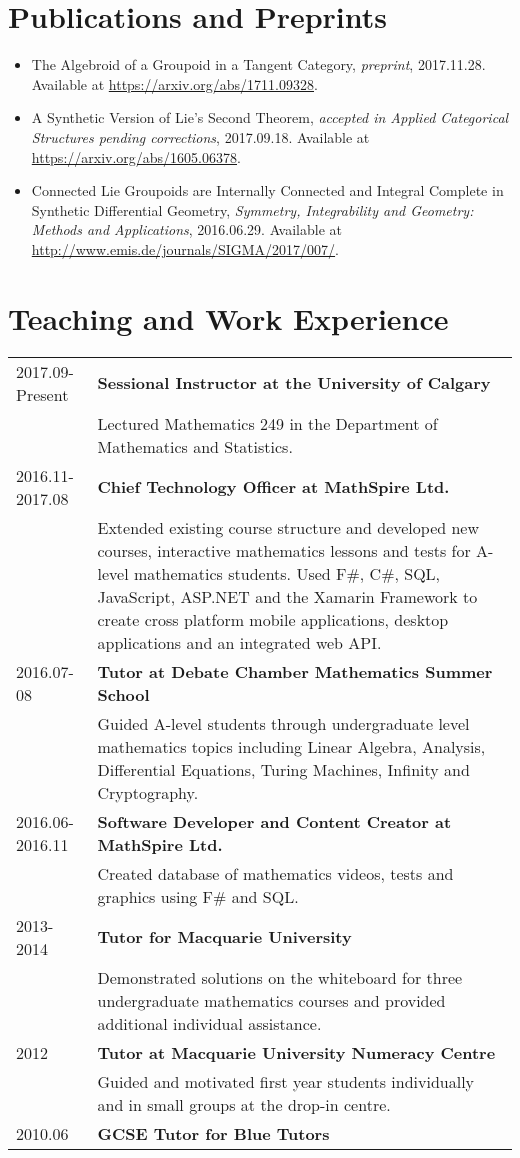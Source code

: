 \documentclass[10pt]{article}
\begin{document}
\section*{Publications and Preprints}
\begin{itemize}
    \item The Algebroid of a Groupoid in a Tangent Category, \emph{preprint}, 2017.11.28. Available at \url{https://arxiv.org/abs/1711.09328}.
    \item A Synthetic Version of Lie's Second Theorem, \emph{accepted in Applied Categorical Structures pending corrections}, 2017.09.18. Available at \url{https://arxiv.org/abs/1605.06378}.
    \item Connected Lie Groupoids are Internally Connected and Integral Complete in Synthetic Differential Geometry, \emph{Symmetry, Integrability and Geometry: Methods and Applications}, 2016.06.29. Available at \url{http://www.emis.de/journals/SIGMA/2017/007/}.
\end{itemize}

\section*{Teaching and Work Experience}
\begin{tabu}{X[1]X[5]}
    2017.09-Present & \bf{Sessional Instructor at the University of Calgary}\\
        {} & Lectured Mathematics 249 in the Department of Mathematics and Statistics.\\
    2016.11-2017.08 & \bf{Chief Technology Officer at MathSpire Ltd.}\\
        {} & Extended existing course structure and developed new courses, interactive mathematics lessons and tests for A-level mathematics students. Used F\#, C\#, SQL, JavaScript, ASP.NET and the Xamarin Framework to create cross platform mobile applications, desktop applications and an integrated web API.\\
    2016.07-08 & \bf{Tutor at Debate Chamber Mathematics Summer School}\\
        {} & Guided A-level students through undergraduate level mathematics topics including Linear Algebra, Analysis, Differential Equations, Turing Machines, Infinity and Cryptography.\\
    2016.06-2016.11 & \bf{Software Developer and Content Creator at MathSpire Ltd.}\\
        {} & Created database of mathematics videos, tests and graphics using F\# and SQL.\\
    2013-2014 & \bf{Tutor for Macquarie University}\\
        {} & Demonstrated solutions on the whiteboard for three undergraduate mathematics courses and provided additional individual assistance.\\
    2012 & \bf{Tutor at Macquarie University Numeracy Centre}\\
        {} & Guided and motivated first year students individually and in small groups at the drop-in centre.\\
    2010.06 & \bf{GCSE Tutor for Blue Tutors}\\
\end{tabu}
\end{document}
